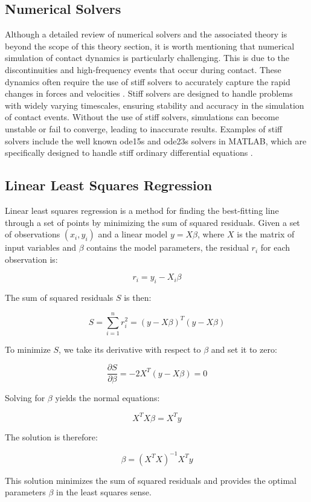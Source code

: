 \subsection{Numerical Solvers}
\label{sec:numerical_solvers}

Although a detailed review of numerical solvers and the associated theory is beyond the scope of this theory section, it is worth mentioning that numerical simulation of contact dynamics is particularly challenging. This is due to the discontinuities and high-frequency events that occur during contact. These dynamics often require the use of stiff solvers to accurately capture the rapid changes in forces and velocities \cite{stiff_contact_ODE_1}\cite{stiff_contact_ODE_2}. Stiff solvers are designed to handle problems with widely varying timescales, ensuring stability and accuracy in the simulation of contact events. Without the use of stiff solvers, simulations can become unstable or fail to converge, leading to inaccurate results. Examples of stiff solvers include the well known ode15s and ode23s solvers in MATLAB, which are specifically designed to handle stiff ordinary differential equations \cite{MATLAB_ODE}. 



\subsection{Linear Least Squares Regression}
Linear least squares regression is a method for finding the best-fitting line through a set of points by minimizing the sum of squared residuals. Given a set of observations \((x_i, y_i)\) and a linear model \(y = X\beta\), where \(X\) is the matrix of input variables and \(\beta\) contains the model parameters, the residual \(r_i\) for each observation is:

\[
r_i = y_i - X_i\beta
\]

The sum of squared residuals \(S\) is then:

\[
S = \sum_{i=1}^n r_i^2 = (y - X\beta)^T(y - X\beta)
\]

To minimize \(S\), we take its derivative with respect to \(\beta\) and set it to zero:

\[
\frac{\partial S}{\partial \beta} = -2X^T(y - X\beta) = 0
\]

Solving for \(\beta\) yields the normal equations:

\[
X^TX\beta = X^Ty
\]

The solution is therefore:

\[
\beta = (X^TX)^{-1}X^Ty
\]

This solution minimizes the sum of squared residuals and provides the optimal parameters \(\beta\) in the least squares sense.

